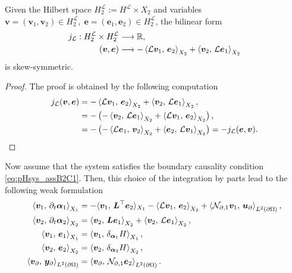 \begin{proposition}
	Given the Hilbert space $H^{\mathcal{L}}_2 := H^\mathcal{L} \times X_2$ and variables $\bm{v} = (\bm{v}_1, \bm{v}_2) \in H^{\mathcal{L}}_2, \; \bm{e} = (\bm{e}_1, \bm{e}_2) \in H^{\mathcal{L}}_2$, the bilinear form 
	\begin{equation*}
	\begin{aligned}
	j_\mathcal{L}: H^{\mathcal{L}}_2 \times H^{\mathcal{L}}_2 &\longrightarrow \mathbb{R}, \\
	(\bm{v}, \bm{e}) &\longrightarrow -\inner[X_2]{\mathcal{L}\bm{v}_1}{\bm{e}_2} + \inner[X_2]{\bm{v}_2}{\mathcal{L}\bm{e}_1}
	\end{aligned}
	\end{equation*}
	is skew-symmetric.
	\begin{proof}
		The proof is obtained by the following computation
		\begin{equation*}
		\begin{aligned}
		j_\mathcal{L}(\bm{v}, \bm{e}) &= -\inner[X_2]{\mathcal{L}\bm{v}_1}{\bm{e}_2} + \inner[X_2]{\bm{v}_2}{\mathcal{L}\bm{e}_1}, \\
		&= - \left( - \inner[X_2]{\bm{v}_2}{\mathcal{L}\bm{e}_1} + \inner[X_2]{\mathcal{L}\bm{v}_1}{\bm{e}_2}\right), \\
		&= - \left( - \inner[X_2]{\mathcal{L}\bm{e}_1}{\bm{v}_2} + \inner[X_2]{\bm{e}_2}{\mathcal{L}\bm{v}_1}\right) = - j_\mathcal{L}(\bm{e}, \bm{v}).
		\end{aligned}
		\end{equation*}
	\end{proof}
\end{proposition}

Now assume that the system satisfies the boundary causality condition \ref{eq:pHsys_assB2C1}. Then, this choice of the integration by parts lead to the following weak formulation
\begin{equation}\label{eq:weak_sys_intJ1}
\begin{aligned}
\inner[X_1]{\bm{v}_1}{\partial_t \bm{\alpha}_1} &=   -  \langle{\bm{v}_1}, \,{\bm{L}^\top \bm{e}_2}\rangle_{X_1}  -\inner[X_2]{\mathcal{L}\bm{v}_1}{\bm{e}_2} + \inner[L^2(\partial \Omega)]{\mathcal{N}_{\partial, 1} \bm{v}_1}{\bm{u}_\partial}, \\
\inner[X_2]{\bm{v}_2}{\partial_t \bm{\alpha}_2} &=   \inner[X_2]{\bm{v}_2}{\bm{L}\bm{e}_1} + \inner[X_2]{\bm{v}_2}{\mathcal{L}\bm{e}_1}, \\
\inner[X_1]{\bm{v}_1}{\bm{e}_1}&= \inner[X_1]{\bm{v}_1}{\delta_{\bm{\alpha}_1} H}, \\
\inner[X_2]{\bm{v}_2}{\bm{e}_2}&= \inner[X_2]{\bm{v}_2}{\delta_{\bm{\alpha}_2} H}, \\
\inner[L^2(\partial \Omega)]{\bm{v}_\partial}{\bm{y}_\partial} &= \inner[L^2(\partial \Omega)]{\bm{v}_\partial}{\mathcal{N}_{\partial, 1}\bm{e}_2}.
\end{aligned}
\end{equation}

